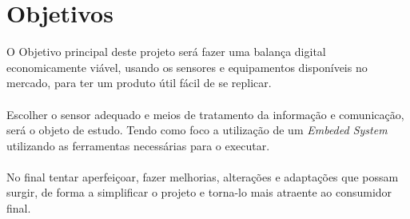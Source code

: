 \section{Objetivos}
O Objetivo principal deste projeto será fazer uma balança digital economicamente viável, usando os sensores e equipamentos disponíveis no mercado, para ter um produto útil fácil de se replicar.
\\
\\
Escolher o sensor adequado e meios de tratamento da informação e comunicação, será o objeto de estudo. Tendo como foco a utilização de um \textit{Embeded System} utilizando as ferramentas necessárias para o executar.
\\
\\
No final tentar aperfeiçoar, fazer melhorias, alterações e adaptações que possam surgir, de forma a simplificar o projeto e torna-lo mais atraente ao consumidor final.
\newpage
